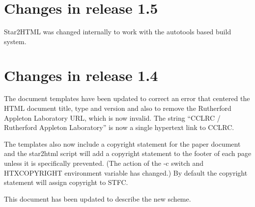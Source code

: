 \documentclass[twoside,11pt]{article}
\newcommand{\xlabel}[1]{}
\renewcommand{\_}{\texttt{\symbol{95}}}
\begin{document}
\section{\xlabel{changes15}\label{changes15}Changes in release 1.5}
Star2HTML was changed internally to work with the autotools based
build system.

\section{\xlabel{changes14}\label{changes14}Changes in release 1.4}
The document templates have been updated to correct an error that centered
the HTML document title, type and version and also to remove the Rutherford
Appleton Laboratory URL, which is now invalid. The string ``CCLRC /
Rutherford Appleton Laboratory'' is now a single hypertext link to CCLRC.

The templates also now include a copyright statement for the paper document
and the star2html script will add a copyright statement to the footer of each
page unless it is specifically prevented. (The action of the -c switch and 
HTX\_COPYRIGHT environment variable has changed.) By default the copyright 
statement will assign copyright to STFC.

This document has been updated to describe the new scheme.
\end{document}
